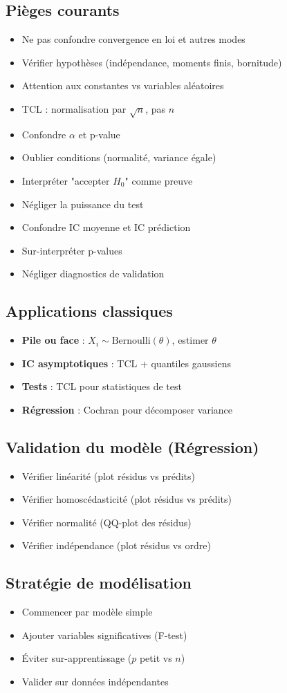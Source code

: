 \documentclass[8pt,twocolumn]{article}
\newcommand{\myrem}[1]{\textcolor{remcolor}{\textbf{#1}}}
\begin{document}
\subsection{\myrem{Pièges courants}}
\begin{itemize}[nosep]
\item Ne pas confondre convergence en loi et autres modes
\item Vérifier hypothèses (indépendance, moments finis, bornitude)
\item Attention aux constantes vs variables aléatoires
\item TCL : normalisation par $\sqrt{n}$, pas $n$
\item Confondre $\alpha$ et p-value
\item Oublier conditions (normalité, variance égale)
\item Interpréter "accepter $H_0$" comme preuve
\item Négliger la puissance du test
\item Confondre IC moyenne et IC prédiction
\item Sur-interpréter p-values
\item Négliger diagnostics de validation
\end{itemize}

\subsection{\myrem{Applications classiques}}
\begin{itemize}[nosep]
\item \textbf{Pile ou face} : $X_i \sim \text{Bernoulli}(\theta)$, estimer $\theta$
\item \textbf{IC asymptotiques} : TCL + quantiles gaussiens
\item \textbf{Tests} : TCL pour statistiques de test
\item \textbf{Régression} : Cochran pour décomposer variance
\end{itemize}

\subsection{\myrem{Validation du modèle (Régression)}}
\begin{itemize}[nosep]
\item Vérifier linéarité (plot résidus vs prédits)
\item Vérifier homoscédasticité (plot résidus vs prédits)
\item Vérifier normalité (QQ-plot des résidus)
\item Vérifier indépendance (plot résidus vs ordre)
\end{itemize}

\subsection{\myrem{Stratégie de modélisation}}
\begin{itemize}[nosep]
\item Commencer par modèle simple
\item Ajouter variables significatives (F-test)
\item Éviter sur-apprentissage ($p$ petit vs $n$)
\item Valider sur données indépendantes
\end{itemize}
\end{document}
